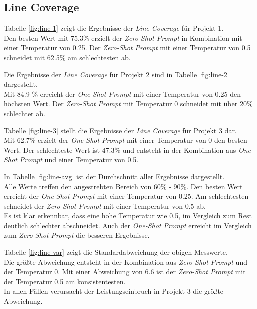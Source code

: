 \subsection{Line Coverage}
Tabelle \ref{fig:line-1} zeigt die Ergebnisse der \textit{Line Coverage} für Projekt 1. \\Den besten Wert mit 75.3\% erzielt der \textit{Zero-Shot Prompt} in Kombination mit einer Temperatur von 0.25. Der \textit{Zero-Shot Prompt} mit einer Temperatur von 0.5 schneidet mit 62.5\% am schlechtesten ab.

Die Ergebnisse der \textit{Line Coverage} für Projekt 2 sind in Tabelle \ref{fig:line-2} dargestellt. \\Mit 84.9 \% erreicht der \textit{One-Shot Prompt} mit einer Temperatur von 0.25 den höchsten Wert. Der \textit{Zero-Shot Prompt} mit Temperatur 0 schneidet mit über 20\% schlechter ab.

Tabelle \ref{fig:line-3} stellt die Ergebnisse der \textit{Line Coverage} für Projekt 3 dar. \\Mit 62.7\% erzielt der \textit{One-Shot Prompt} mit einer Temperatur von 0 den besten Wert. Der schlechteste Wert ist 47.3\% und entsteht in der Kombination aus \textit{One-Shot Prompt} und einer Temperatur von 0.5.

In Tabelle \ref{fig:line-avg} ist der Durchschnitt aller Ergebnisse dargestellt.\\ Alle Werte treffen den angestrebten Bereich von 60\% - 90\%. Den besten Wert erreicht der \textit{One-Shot Prompt} mit einer Temperatur von 0.25. Am schlechtesten schneidet der \textit{Zero-Shot Prompt} mit einer Temperatur von 0.5 ab. \\Es ist klar erkennbar, dass eine hohe Temperatur wie 0.5, im Vergleich zum Rest deutlich schlechter abschneidet. Auch der \textit{One-Shot Prompt} erreicht im Vergleich zum \textit{Zero-Shot Prompt} die besseren Ergebnisse. 

Tabelle \ref{fig:line-var} zeigt die Standardabweichung der obigen Messwerte.\\ Die größte Abweichung entsteht in der Kombination aus \textit{Zero-Shot Prompt} und der Temperatur 0. Mit einer Abweichung von 6.6 ist der \textit{Zero-Shot Prompt} mit der Temperatur 0.5 am konsistentesten.\\ In allen Fällen verursacht der Leistungseinbruch in Projekt 3 die größte Abweichung.


